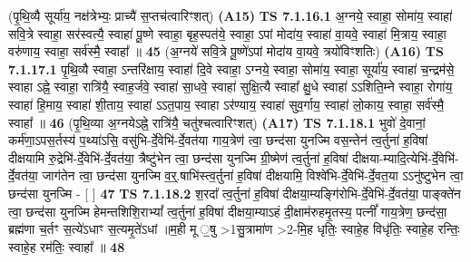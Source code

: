 \documentclass[17pt]{extarticle}
\begin{document}
                  \newline
                      (पृ॒थि॒व्यै सूर्या॑य॒ नक्ष॑त्रेभ्यः॒ प्राच्यै॑ स॒प्तच॑त्वारिꣳशत्)  \textbf{(A15)} \newline \newline
                                        \textbf{ TS 7.1.16.1} \newline
                  अ॒ग्नये॒ स्वाहा॒ सोमा॑य॒ स्वाहा॑ सवि॒त्रे स्वाहा॒ सर॑स्वत्यै॒ स्वाहा॑ पू॒ष्णे स्वाहा॒ बृह॒स्पत॑ये॒ स्वाहा॒ ऽपां मोदा॑य॒ स्वाहा॑ वा॒यवे॒ स्वाहा॑ मि॒त्राय॒ स्वाहा॒ वरु॑णाय॒ स्वाहा॒ सर्व॑स्मै॒ स्वाहा᳚ ॥ \textbf{  45} \newline
                  \newline
                      (अ॒ग्नये॑ सवि॒त्रे पू॒ष्णे॑ऽपां मोदा॑य वा॒यवे॒ त्रयो॑विꣳशतिः)  \textbf{(A16)} \newline \newline
                                        \textbf{ TS 7.1.17.1} \newline
                  पृ॒थि॒व्यै स्वाहा॒ ऽन्तरि॑क्षाय॒ स्वाहा॑ दि॒वे स्वाहा॒ ऽग्नये॒ स्वाहा॒ सोमा॑य॒ स्वाहा॒ सूर्या॑य॒ स्वाहा॑ च॒न्द्रम॑से॒ स्वाहा ऽह्ने॒ स्वाहा॒ रात्रि॑यै॒ स्वाह॒र्जवे॒ स्वाहा॑ सा॒धवे॒ स्वाहा॑ सुक्षि॒त्यै स्वाहा᳚ क्षु॒धे स्वाहा॑ ऽऽशिति॒म्ने स्वाहा॒ रोगा॑य॒ स्वाहा॑ हि॒माय॒ स्वाहा॑ शी॒ताय॒ स्वाहा॑ ऽऽत॒पाय॒ स्वाहा ऽर॑ण्याय॒ स्वाहा॑ सुव॒र्गाय॒ स्वाहा॑ लो॒काय॒ स्वाहा॒ सर्व॑स्मै॒ स्वाहा᳚ ॥ \textbf{  46} \newline
                  \newline
                      (पृ॒थि॒व्या अ॒ग्नयेऽह्ने॒ रात्रि॑यै॒ चतु॑श्चत्वारिꣳशत्)  \textbf{(A17)} \newline \newline
                                        \textbf{ TS 7.1.18.1} \newline
                  भुवो॑ दे॒वानां॒ कर्म॑णा॒ऽपस॒र्तस्य॑ प॒थ्या॑ऽसि॒ वसु॑भि-र्दे॒वेभि॑-र्दे॒वत॑या गाय॒त्रेण॑ त्वा॒ छन्द॑सा युनज्मि वस॒न्तेन॑ त्व॒र्तुना॑ ह॒विषा॑ दीक्षयामि रु॒द्रेभि॑-र्दे॒वेभि॑-र्दे॒वत॑या॒ त्रैष्टु॑भेन त्वा॒ छन्द॑सा युनज्मि ग्री॒ष्मेण॑ त्व॒र्तुना॑ ह॒विषा॑ दीक्षया-म्यादि॒त्येभि॑-र्दे॒वेभि॑-र्दे॒वत॑या॒ जाग॑तेन त्वा॒ छन्द॑सा युनज्मि व॒र्॒.षाभि॑स्त्व॒र्तुना॑ ह॒विषा॑ दीक्षयामि॒ विश्वे॑भि-र्दे॒वेभि॑-र्दे॒वत॒या ऽऽनु॑ष्टुभेन त्वा॒ छन्द॑सा युनज्मि - [  ] \textbf{  47} \newline
                  \newline
                                \textbf{ TS 7.1.18.2} \newline
                  श॒रदा᳚ त्व॒र्तुना॑ ह॒विषा॑ दीक्षया॒म्यङ्गि॑रोभि-र्दे॒वेभि॑-र्दे॒वत॑या॒ पाङ्क्ते॑न त्वा॒ छन्द॑सा युनज्मि हेमन्तशिशि॒राभ्यां᳚ त्व॒र्तुना॑ ह॒विषा॑ दीक्षया॒म्याऽहं दी॒क्षाम॑रुहमृ॒तस्य॒ पत्नीं᳚ गाय॒त्रेण॒ छन्द॑सा॒ ब्रह्म॑णा च॒र्तꣳ स॒त्ये॑ऽधाꣳ स॒त्यमृ॒ते॑ऽधां ॥म॒ही मू ॒षु >1सु॒त्रामा॑ण >2-मि॒ह धृतिः॒ स्वाहे॒ह विधृ॑तिः॒ स्वाहे॒ह रन्तिः॒ स्वाहे॒ह रम॑तिः॒ स्वाहा᳚ ॥ \textbf{  48} \newline
\end{document}
